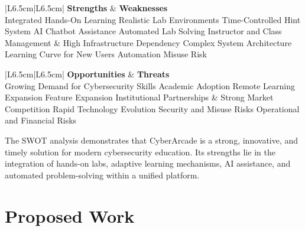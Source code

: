 \documentclass[12pt,a4paper]{report}
\newcommand{\hrow}{}
\newcommand{\hcell}[1]{\textbf{#1}}
\begin{document}
\begin{table}[htbp]
\centering
\begin{tabular}{|L{6.5cm}|L{6.5cm}|}
\hline
\hrow \hcell{Strengths} & \hcell{Weaknesses} \\
\hline
Integrated Hands-On Learning \newline
Realistic Lab Environments \newline
Time-Controlled Hint System \newline
AI Chatbot Assistance \newline
Automated Lab Solving \newline
Instructor and Class Management &
High Infrastructure Dependency \newline
Complex System Architecture \newline
Learning Curve for New Users \newline
Automation Misuse Risk \\\hline
\end{tabular}

\vspace{8pt}

\begin{tabular}{|L{6.5cm}|L{6.5cm}|}
\hline
\hrow \hcell{Opportunities} & \hcell{Threats} \\
\hline
Growing Demand for Cybersecurity Skills \newline
Academic Adoption \newline
Remote Learning Expansion \newline
Feature Expansion \newline
Institutional Partnerships &
Strong Market Competition \newline
Rapid Technology Evolution \newline
Security and Misuse Risks \newline
Operational and Financial Risks \\\hline
\end{tabular}
\caption{SWOT Analysis}\label{tab:swot}
\end{table}

The SWOT analysis demonstrates that CyberArcade is a strong, innovative, and timely solution for
modern cybersecurity education. Its strengths lie in the integration of hands-on labs, adaptive
learning mechanisms, AI assistance, and automated problem-solving within a unified platform.

\chapter{Proposed Work}
\end{document}
